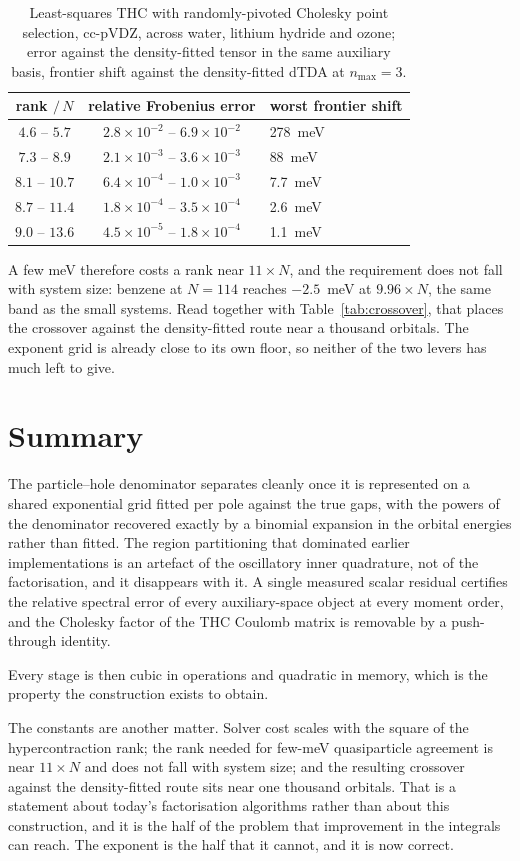 \documentclass[11pt]{article}
\begin{document}
\begin{table}[h]
\centering
\begin{tabular}{ccl}
\toprule
rank $/\,N$ & relative Frobenius error & worst frontier shift \\
\midrule
$4.6$ -- $5.7$   & $2.8\times10^{-2}$ -- $6.9\times10^{-2}$ & 278~meV \\
$7.3$ -- $8.9$   & $2.1\times10^{-3}$ -- $3.6\times10^{-3}$ & 88~meV \\
$8.1$ -- $10.7$  & $6.4\times10^{-4}$ -- $1.0\times10^{-3}$ & 7.7~meV \\
$8.7$ -- $11.4$  & $1.8\times10^{-4}$ -- $3.5\times10^{-4}$ & 2.6~meV \\
$9.0$ -- $13.6$  & $4.5\times10^{-5}$ -- $1.8\times10^{-4}$ & 1.1~meV \\
\bottomrule
\end{tabular}
\caption{Least-squares THC with randomly-pivoted Cholesky point selection, cc-pVDZ, across
water, lithium hydride and ozone; error against the density-fitted tensor in the same
auxiliary basis, frontier shift against the density-fitted dTDA at $n_{\max}=3$.}
\label{tab:rank}
\end{table}

A few meV therefore costs a rank near $11 \times N$, and the requirement does not fall with
system size: benzene at $N = 114$ reaches $-2.5$~meV at $9.96 \times N$, the same band as
the small systems. Read together with Table~\ref{tab:crossover}, that places the crossover
against the density-fitted route near a thousand orbitals. The exponent grid is already
close to its own floor, so neither of the two levers has much left to give.

\section{Summary}

The particle--hole denominator separates cleanly once it is represented on a shared
exponential grid fitted per pole against the true gaps, with the powers of the denominator
recovered exactly by a binomial expansion in the orbital energies rather than fitted. The
region partitioning that dominated earlier implementations is an artefact of the oscillatory
inner quadrature, not of the factorisation, and it disappears with it. A single measured
scalar residual certifies the relative spectral error of every auxiliary-space object at
every moment order, and the Cholesky factor of the THC Coulomb matrix is removable by a
push-through identity.

Every stage is then cubic in operations and quadratic in memory, which is the property the
construction exists to obtain.

The constants are another matter. Solver cost scales with the square of the
hypercontraction rank; the rank needed for few-meV quasiparticle agreement is near
$11 \times N$ and does not fall with system size; and the resulting crossover against the
density-fitted route sits near one thousand orbitals. That is a statement about today's
factorisation algorithms rather than about this construction, and it is the half of the
problem that improvement in the integrals can reach. The exponent is the half that it
cannot, and it is now correct.
\end{document}
